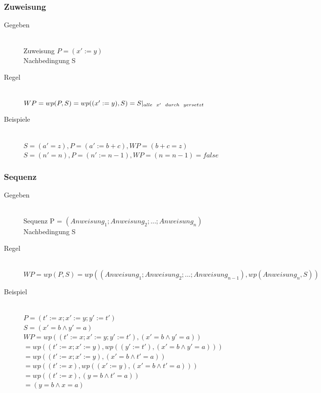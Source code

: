 \documentclass[a4paper,10pt]{article}
\begin{document}
\subsubsection{Zuweisung}
\begin{description}
	\item[Gegeben] \hfill \\
		Zuweisung $P = (x' := y)$ \\
		Nachbedingung S
	\item[Regel] \hfill \\
		$WP = wp(P, S) = wp((x' := y), S) = S |_{alle \hspace{2mm} x' \hspace{2mm} durch \hspace{2mm} y \vspace{2mm} ersetzt}$
	\item[Beispiele] \hfill \\
		$S = (a' = z), P = (a' := b + c), WP = (b + c = z)$ \\
		$S = (n' = n), P = (n' := n-1), WP = (n = n-1) = false$
\end{description}

\subsubsection{Sequenz}
\begin{description}
	\item[Gegeben] \hfill \\
		Sequenz P = $(Anweisung_1; Anweisung_2; ...; Anweisung_n)$ \\
		Nachbedingung S
	\item[Regel] \hfill \\
		$WP = wp(P, S) =
wp((Anweisung_1; Anweisung_2; ...; Anweisung_{n-1}), wp(Anweisung_n, S))$
	\item[Beispiel] \hfill \\
		$P = (t' := x; x' := y; y' := t')$ \\
		$S = (x' = b \wedge y' = a)$ \\
		$WP =wp((t':=x;x':=y;y':=t'),(x'=b \wedge y'=a))$ \\
		$= wp((t' := x; x' := y), wp((y' := t'), (x' = b \wedge y' = a)))$ \\
		$= wp((t' := x; x' := y), (x' = b \wedge t' = a))$ \\
		$= wp((t' := x), wp((x' := y), (x' = b \wedge t' = a)))$ \\
		$= wp((t' := x), (y = b \wedge t' = a))$ \\
		$= (y = b \wedge x = a)$
\end{description}
\end{document}
